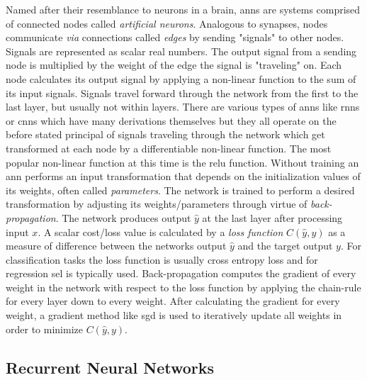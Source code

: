 Named after their resemblance to neurons in a brain, \glspl{ann} are systems comprised of connected nodes called \textit{artificial neurons}. Analogous to synapses, nodes communicate \textit{via} connections called \textit{edges} by sending "signals" to other nodes. Signals are represented as scalar real numbers. The output signal from a sending node is multiplied by the weight of the edge the signal is "traveling" on. Each node calculates its output signal by applying a non-linear function to the sum of its input signals. Signals travel forward through the network from the first to the last layer, but usually not within layers. There are various types of \glspl{ann} like \glspl{rnn} or \glspl{cnn} which have many derivations themselves but they all operate on the before stated principal of signals traveling through the network which get transformed at each node by a differentiable non-linear function. The most popular non-linear function at this time is the \gls{relu} function. Without training an \gls{ann} performs an input transformation that depends on the initialization values of its weights, often called \textit{parameters}. The network is trained to perform a desired transformation by adjusting its weights/parameters through virtue of \textit{back-propagation}. The network produces output $\hat{y}$ at the last layer after processing input $x$. A scalar cost/loss value is calculated by a \textit{loss function} $C(\hat{y}, y)$ as a measure of difference between the networks output $\hat{y}$ and the target output $y$. For classification tasks the loss function is usually cross entropy loss  and for regression \gls{sel} is typically used. Back-propagation computes the gradient of every weight in the network with respect to the loss function by applying the chain-rule for every layer down to every weight. After calculating the gradient for every weight, a gradient method like \gls{sgd} is used to iteratively update all weights in order to minimize $C(\hat{y}, y)$. 

\subsection{Recurrent Neural Networks} \label{sec:background:rnn}

